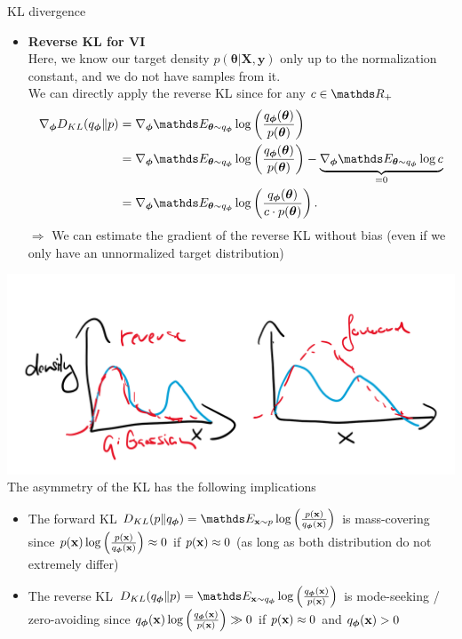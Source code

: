 \documentclass[11pt,compress,t,notes=noshow, xcolor=table]{beamer}
\begin{document}
\begin{vbframe}{KL divergence}
\begin{itemize}
\end{itemize}
 \framebreak

 \begin{itemize}
     \item \textbf{Reverse KL for VI} \\
     Here, we know our target density $p(\bm{\theta}\vert \mathbf{X}, \mathbf{y})$ only up to the normalization constant, and we do not have samples from it. \\
     \lz
     We can directly apply the reverse KL since for any $c\in \R_+$
     \begin{align*}
         \nabla_{\bm{\phi}} D_{KL}(q_{\bm{\phi}}\|p) &= \nabla_{\bm{\phi}} \E_{\bm{\theta} \sim q_{\bm{\phi}}}\log\left(\frac{q_{\bm{\phi}}(\bm{\theta})}{p(\bm{\theta})}\right) \\
         &= \nabla_{\bm{\phi}} \E_{\bm{\theta} \sim q_{\bm{\phi}}}\log\left(\frac{q_{\bm{\phi}}(\bm{\theta})}{p(\bm{\theta})}\right) - \underbrace{\nabla_{\bm{\phi}} \E_{\bm{\theta} \sim q_{\bm{\phi}}}\log c}_{=0}\\
         &= \nabla_{\bm{\phi}} \E_{\bm{\theta} \sim q_{\bm{\phi}}}\log\left(\frac{q_{\bm{\phi}}(\bm{\theta})}{c\cdot p(\bm{\theta})}\right).
     \end{align*}
     $\Rightarrow$ We can estimate the gradient of the reverse KL without bias (even if we only have an unnormalized target distribution)
 \end{itemize}
 \framebreak

\includegraphics[width=0.6\linewidth]{slides/information-theory/figure_man/kl_ml_fkl_rkl.png} \\
The asymmetry of the KL has the following implications
\begin{itemize}
    \item The forward KL $D_{KL}(p\|q_{\bm{\phi}}) = \E_{\xv \sim p} \log\left(\frac{p(\xv)}{q_{\bm{\phi}}(\xv)}\right)$ is mass-covering since $p(\mathbf{x})\log\left(\frac{p(\mathbf{x})}{q_{\bm{\phi}}(\mathbf{x})}\right) \approx 0$ if $p(\mathbf{x}) \approx 0$ (as long as both distribution do not extremely differ)
        \item The reverse KL $D_{KL}(q_{\bm{\phi}}\|p) = \E_{\xv \sim q_{\bm{\phi}}} \log\left(\frac{q_{\bm{\phi}}(\xv)}{p(\xv)}\right)$ is mode-seeking / zero-avoiding since $q_{\bm{\phi}}(\mathbf{x})\log\left(\frac{q_{\bm{\phi}}(\mathbf{x})}{p(\mathbf{x})}\right) \gg 0$ if $p(\mathbf{x}) \approx 0$ and $q_{\bm{\phi}}(\mathbf{x}) > 0$ 
\end{itemize}
 
\end{vbframe}

\endlecture
\end{document}
